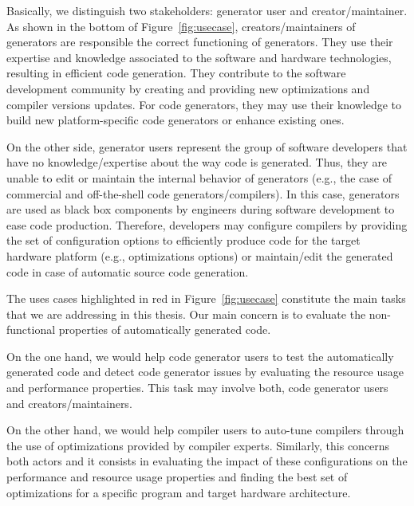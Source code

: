 Basically, we distinguish two stakeholders: generator user and creator/maintainer. As shown in the bottom of Figure~\ref{fig:usecase}, creators/maintainers of generators are responsible  the correct functioning of generators. They use their expertise and knowledge associated to the software and hardware technologies, resulting in efficient code generation. They contribute to the software development community by creating and providing new optimizations and compiler versions updates. For code generators, they may use their knowledge to build new platform-specific code generators or enhance existing ones. 

On the other side, generator users represent the group of software developers that have no knowledge/expertise about the way code is generated. Thus, they are unable to edit or maintain the internal behavior of generators (e.g., the case of commercial and off-the-shell code generators/compilers). In this case, generators are used as black box components by engineers during software development to ease code production. Therefore, developers may configure compilers by providing the set of configuration options to efficiently produce code for the target hardware platform (e.g., optimizations options) or maintain/edit the generated code in case of automatic source code generation.

The uses cases highlighted in red in Figure~\ref{fig:usecase} constitute the main tasks that we are addressing in this thesis. Our main concern is to evaluate the non-functional properties of automatically generated code.

On the one hand, we would help code generator users to test the automatically generated code and detect code generator issues by evaluating the resource usage and performance properties. This task may involve both, code generator users and creators/maintainers.

On the other hand, we would help compiler users to auto-tune compilers through the use of optimizations provided by compiler experts. Similarly, this concerns both actors and it consists in evaluating the impact of these configurations on the performance and resource usage properties and finding the best set of optimizations for a specific program and target hardware architecture.


